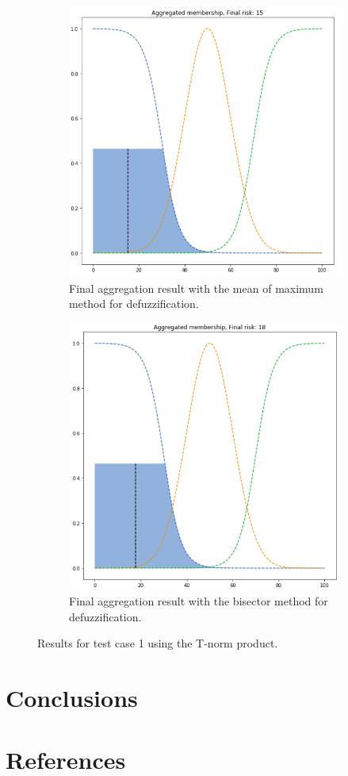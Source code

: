 \documentclass[conference]{IEEEtran}
\begin{document}
\begin{figure}[ht]
\begin{subfigure}{.5\textwidth}
  \centering
  \includegraphics[width=.8\linewidth]{figures/first/prod-mom.png}  
  \caption{Final aggregation result with the mean of maximum method for defuzzification.}
  \label{fig:1prod-mom}
\end{subfigure}
\begin{subfigure}{.5\textwidth}
  \centering
  \includegraphics[width=.8\linewidth]{figures/first/prod-bisector.png}  
  \caption{Final aggregation result with the bisector method for defuzzification.}
  \label{fig:1prod-bisector}
\end{subfigure}
\caption{Results for test case 1 using the T-norm product.}
\label{fig:testcase1prod}
\end{figure}

\section{Conclusions}

\section*{References}

\nocite{*}


\end{document}
